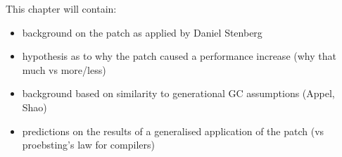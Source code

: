This chapter will contain:

\begin{itemize}
	\item background on the patch as applied by Daniel Stenberg
	\item hypothesis as to why the patch caused a performance increase (why that much vs more/less)
	\item background based on similarity to generational GC assumptions (Appel, Shao)
	\item predictions on the results of a generalised application of the patch (vs proebsting's law for compilers)
\end{itemize}
